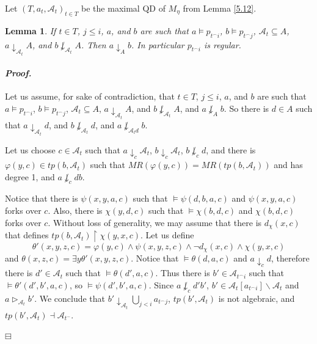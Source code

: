 \documentclass[12pt,a4paper]{amsart}
\newtheorem{lemma}[thm]{Lemma}
\newtheorem{cor}[thm]{Corollary}
\theoremstyle{definition}
\theoremstyle{remark}
\renewcommand{\restriction}{\mathbin\upharpoonright}
\newenvironment{cproof}{\paragraph{\emph{Proof.\,}}}{\hfill{$\boxminus$}\par\vspace{2mm}}
\begin{document}

Let $(T, a_t, \mathcal{A}_t)_{t\in T}$ be the maximal QD of $M_\eta$ from Lemma \ref{5.12}.

\begin{lemma}\label{Lemma_5-2}
    If $t\in T$, $j\leq i$, $a$, and $b$ are such that $a\models p_{t^\frown i}$, $b\models p_{t^\frown j}$, $\mathcal{A}_t\subseteq A$, $a\downarrow_{\mathcal{A}_t}A$, and $b\not\downarrow_{\mathcal{A}_t}A$. Then $a\downarrow_A b$. In particular $p_{t^\frown i}$ is regular.
\end{lemma}
\begin{cproof}
    Let us assume, for sake of contradiction, that $t\in T$, $j\leq i$, $a$, and $b$ are such that $a\models p_{t^\frown i}$, $b\models p_{t^\frown j}$, $\mathcal{A}_t\subseteq A$, $a\downarrow_{\mathcal{A}_t}A$, and $b\not\downarrow_{\mathcal{A}_t}A$, and $a\not\downarrow_A b$. So there is $d\in A$ such that $a\downarrow_{\mathcal{A}_t}d$, and $b\not\downarrow_{\mathcal{A}_t}d$, and $a\not\downarrow_{\mathcal{A}_t d} b$.
    
    Let us choose $c\in\mathcal{A}_t$ such that $a\downarrow_c \mathcal{A}_t$, $b\downarrow_c\mathcal{A}_t$, $b\not\downarrow_c d$, and there is $\varphi(y,c)\in tp(b,\mathcal{A}_t)$ such that $MR(\varphi(y,c))=MR(tp(b,\mathcal{A}_t))$ and has degree 1, and $a\not\downarrow_c db$. 

    Notice that there is $\psi(x,y,a,c)$ such that $\models \psi(d,b,a,c)$ and $\psi(x,y,a,c)$ forks over $c$. Also, there is $\chi(y,d,c)$ such that $\models\chi(b,d,c)$ and $\chi(b,d,c)$ forks over $c$. Without loss of generality, we may assume that there is $d_\chi(x,c)$ that defines $tp(b,\mathcal{A}_t)\restriction \chi(y,x,c)$. Let us define $$\theta'(x,y,z,c)=\varphi(y,c)\wedge \psi(x,y,z,c)\wedge \neg d_\chi(x,c)\wedge \chi(y,x,c)$$ and $\theta(x,z,c)=\exists y \theta'(x,y,z,c)$. 
    Notice that $\models \theta(d,a,c)$ and $a\downarrow_c d$, therefore there is $d'\in \mathcal{A}_t$ such that $\models \theta(d',a,c)$. Thus there is $b'\in \mathcal{A}_{t^\frown i}$ such that $\models \theta'(d',b',a,c)$, so $\models \psi(d',b',a,c)$. Since $a\not\downarrow_{c}d'b'$, $b'\in \mathcal{A}_{t}[a_{t^\frown i}]\backslash \mathcal{A}_t$ and $a\triangleright_{\mathcal{A}_t} b'$. 
    We conclude that $b'\downarrow_{\mathcal{A}_t}\bigcup_{j<i}a_{t^\frown j}$, $tp(b',\mathcal{A}_t)$ is not algebraic, and $tp(b',\mathcal{A}_t)\dashv\mathcal{A}_{t^-}$.


\end{cproof}
\end{document}
